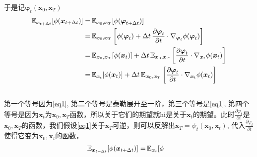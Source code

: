\documentclass{article}
\newcommand{\tmmathbf}[1]{\ensuremath{\boldsymbol{#1}}}
\begin{document}
\begin{CJK*}{UTF8}{gbsn}
于是记$\tmmathbf{\varphi}_t (\tmmathbf{x}_0, \tmmathbf{x}_T)$
\[ \begin{equation}
     \begin{aligned}
       \mathbb{E}_{\tmmathbf{x}_{t + \Delta t}} [\phi (\tmmathbf{x}_{t +
       \Delta t})] = & \hspace{0.17em} \mathbb{E}_{\tmmathbf{x}_0,
       \tmmathbf{x}_T} [\phi (\tmmathbf{\varphi}_{t + \Delta t})]\\
       = & \hspace{0.17em} \mathbb{E}_{\tmmathbf{x}_0, \tmmathbf{x}_T}  \left[
       \phi (\tmmathbf{\varphi}_t) + \Delta t \hspace{0.17em} \frac{\partial
       \tmmathbf{\varphi}_t}{\partial t} \cdot \nabla_{\tmmathbf{\varphi}_t}
       \phi (\tmmathbf{\varphi}_t) \right]\\
       = & \hspace{0.17em} \mathbb{E}_{\tmmathbf{x}_0, \tmmathbf{x}_T} [\phi
       (\tmmathbf{x}_t)] + \Delta t \hspace{0.17em}
       \mathbb{E}_{\tmmathbf{x}_0, \tmmathbf{x}_T}  \left[ \frac{\partial
       \tmmathbf{\varphi}_t}{\partial t} \cdot \nabla_{\tmmathbf{x}_t} \phi
       (\tmmathbf{x}_t) \right]\\
       = & \hspace{0.17em} \mathbb{E}_{\tmmathbf{x}_t} [\phi (\tmmathbf{x}_t)]
       + \Delta t \hspace{0.17em} \mathbb{E}_{\tmmathbf{x}_0, \tmmathbf{x}_T} 
       \left[ \frac{\partial \tmmathbf{\varphi}_t}{\partial t} \cdot
       \nabla_{\tmmathbf{x}_t} \phi (\tmmathbf{x}_t) \right]\\
       & 
     \end{aligned}
   \end{equation} \]
第一个等号因为\eqref{eq1},
第二个等号是泰勒展开至一阶，第三个等号是\eqref{eq1},
第四个等号是因为$\tmmathbf{x}_t$为$\tmmathbf{x}_0,
\tmmathbf{x}_T$函数，所以关于它们的期望就hi是关于$\tmmathbf{x}_t$的期望。此时$\frac{\partial
\varphi_t}{\partial t}$是$\tmmathbf{x}_0,
\tmmathbf{x}_T$的函数，我们假设\eqref{eq1}关于$\tmmathbf{x}_T$可逆，则可以反解出$\tmmathbf{x}_T
= \psi_t (\tmmathbf{x}_0, \tmmathbf{x}_t)$, 代入$\frac{\partial
\varphi_t}{\partial t}$使得它变为$\tmmathbf{x}_0,
\tmmathbf{x}_t$的函数，
\[ \begin{equation}
     \begin{aligned}
       \mathbb{E}_{\tmmathbf{x}_{t + \Delta t}} [\phi (\tmmathbf{x}_{t +
       \Delta t})] = & \hspace{0.17em} \mathbb{E}_{\tmmathbf{x}_t} [\phi

\end{aligned}
\end{equation}\]
\end{CJK*}
\end{document}
